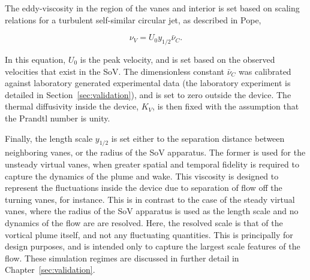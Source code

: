 The eddy-viscosity in the region of the vanes and interior is set
based on scaling relations for a turbulent self-similar circular jet, as
described in Pope\cite{pope2000turbulent},
 
\begin{equation}
  \nu_V = U_0 y_{1/2} \bar \nu_C.
\end{equation}

In this equation, $U_0$ is the peak velocity, 
and is set based on the observed
velocities that exist in the SoV. 
%
The dimensionless constant $\bar \nu_C $ was calibrated against
laboratory generated experimental data 
(the laboratory experiment is detailed in Section~\ref{sec:validation}), 
and is set to zero outside the device. 
The thermal diffusivity inside the device, $K_V$, is then fixed with the 
assumption that the Prandtl number is unity.  

Finally, the length scale $y_{1/2}$ is set either to the 
separation distance between neighboring vanes, or the radius of the SoV
apparatus. The former is used for the unsteady virtual vanes, when
greater spatial and temporal fidelity is required to capture the
dynamics of the plume and wake. This viscosity is designed to represent
the fluctuations inside the device due to separation of flow off the
turning vanes, for instance. This is in contrast to the case of the
steady virtual vanes, where the radius of the SoV apparatus is used as
the length scale and no dynamics of the flow are are resolved. Here, the
resolved scale is that of the vortical plume itself, and not any
fluctuating quantities. This is principally for design purposes, and is
intended only to capture the largest scale features of the flow. These
simulation regimes are discussed in further detail in
Chapter~\ref{sec:validation}. 



